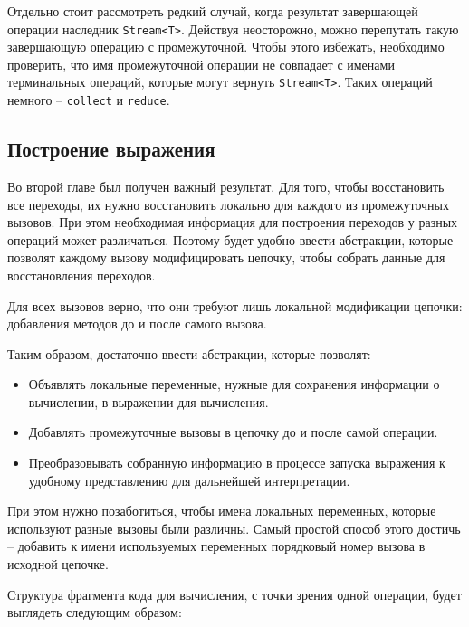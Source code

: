 Отдельно стоит рассмотреть редкий случай, когда результат завершающей операции наследник \texttt{Stream<T>}. Действуя неосторожно, можно перепутать такую завершающую операцию с промежуточной. Чтобы этого избежать, необходимо проверить, что имя промежуточной операции не совпадает с именами терминальных операций, которые могут вернуть \texttt{Stream<T>}. Таких операций немного -- \texttt{collect} и \texttt{reduce}.

\subsection{Построение выражения} 
Во второй главе был получен важный результат. Для того, чтобы восстановить все переходы, их нужно восстановить локально для каждого из промежуточных вызовов. При этом необходимая информация для построения переходов у разных операций может различаться. Поэтому будет удобно ввести абстракции, которые позволят каждому вызову модифицировать цепочку, чтобы собрать данные для восстановления переходов. 

Для всех вызовов верно, что они требуют лишь локальной модификации цепочки: добавления методов до и после самого вызова. 

Таким образом, достаточно ввести абстракции, которые позволят:
\begin{itemize}
	\item Объявлять локальные переменные, нужные для сохранения информации о вычислении, в выражении для вычисления.
	\item Добавлять промежуточные вызовы в цепочку до и после самой операции.
	\item Преобразовывать собранную информацию в процессе запуска выражения к удобному представлению для дальнейшей интерпретации.
\end{itemize}

При этом нужно позаботиться, чтобы имена локальных переменных, которые используют разные вызовы были различны. Самый простой способ этого достичь -- добавить к имени используемых переменных порядковый номер вызова в исходной цепочке.

Структура фрагмента кода для вычисления, с точки зрения одной операции, будет выглядеть следующим образом:

\inputminted{java}{chapter3/code/EvalCode.java}

